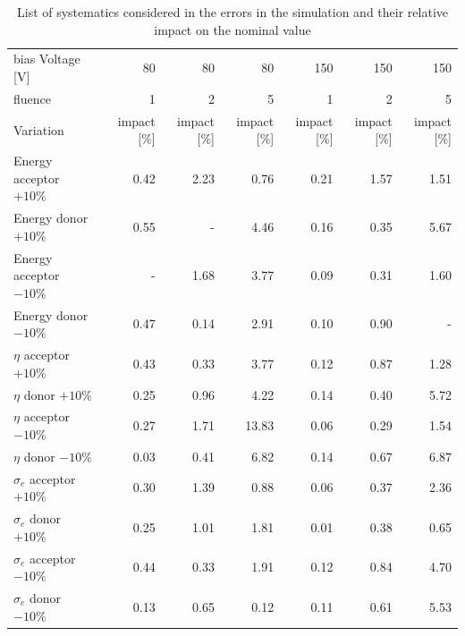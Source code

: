 \begin{table}[!htpb]
   \caption{List of systematics considered in the errors in the simulation and their relative impact on the nominal value}
   \label{tab:SystError}
\begin{center}
\setlength{\tabcolsep}{0.0pc}
{\tiny
\begin{tabular*}{0.7\textwidth}{@{\extracolsep{\fill}}lrrrrrr}
\noalign{\smallskip}\hline\noalign{\smallskip}
bias Voltage [V]		& 80 & 80 & 80& 150 & 150 &150\\
fluence 					& 1 & 2 & 5 & 1 & 2 & 5\\
\noalign{\smallskip}\hline\noalign{\smallskip}

Variation 				& impact [\%] & impact [\%] & impact [\%] & impact [\%]& impact [\%] & impact [\%]\\
\noalign{\smallskip}\hline\hline\noalign{\smallskip}

Energy acceptor $+10\%$   		& 0.42  	& 2.23  &0.76 & 0.21 & 1.57   &1.51  \\
Energy donor $+10\%$  			& 0.55  	&  -    & 4.46 & 0.16 & 0.35  &5.67\\
Energy acceptor $-10\%$  		& - 		&  1.68 & 3.77& 0.09  & 0.31  & 1.60 \\
Energy donor $-10\%$			& 0.47  	& 0.14  & 2.91 & 0.10  & 0.90 & -\\
\noalign{\smallskip}\hline\noalign{\smallskip}


$\eta$  acceptor $+10\%$  		& 0.43  	& 0.33   & 3.77   & 0.12  & 0.87  &1.28\\
$\eta$  donor $+10\%$  			& 0.25  	& 0.96   & 4.22   & 0.14  & 0.40  &5.72\\
$\eta$  acceptor $-10\%$  		& 0.27  	& 1.71   & 13.83 & 0.06  & 0.29   &1.54 \\
$\eta$  donor $-10\%$ 			& 0.03 	& 0.41   & 6.82   & 0.14  & 0.67   &6.87\\
\noalign{\smallskip}\hline\noalign{\smallskip}

$\sigma_e$ acceptor $+10\%$  	& 0.30		& 1.39   & 0.88 & 0.06 & 0.37  & 2.36\\
$\sigma_e$  donor $+10\%$  		& 0.25  	& 1.01   & 1.81 & 0.01 & 0.38   & 0.65 \\
$\sigma_e$  acceptor $-10\%$  	& 0.44  	& 0.33   &1.91 & 0.12  & 0.84   &4.70\\
$\sigma_e$  donor $-10\%$ 			& 0.13  	& 0.65   & 0.12 & 0.11 & 0.61  &5.53 \\


\end{tabular*}}
\end{center}
\end{table}
